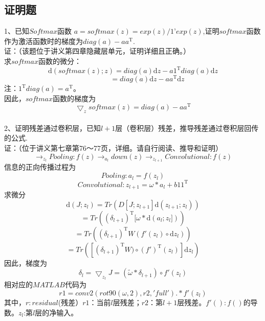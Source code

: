 \documentclass[UFT8]{ctexart}
\begin{document}
\subsection{证明题}
1、已知$Softmax$函数 $a = softmax(z) =exp(z)/1’exp(z)$,证明$softmax$函数作为激活函数时的梯度为$diag(a) - aa^\mathrm{T}$.\\
证：（该题位于讲义第四章隐藏层单元，证明详细且正确。）\\
求$softmax$函数的微分：\\
\begin{displaymath}
\mathrm{d} (softmax(z);z) = diag(a)\mathrm{d} z - a1^\mathrm{T}diag(a)\mathrm{d} z
\end{displaymath}
\[ \qquad \qquad = diag(a)\mathrm{d}z - aa^\mathrm{T}\mathrm{d}z\]
注：$1^\mathrm{T}diag(a) = a^\mathrm{T}$。\\
因此，$softmax$函数的梯度为
\[ \bigtriangledown_{z}softmax(z) = diag(a) - aa^\mathrm{T} \]
~\\

2、证明残差通过卷积层，已知$l+1$层（卷积层）残差，推导残差通过卷积层回传的公式. \\
证：（位于讲义第七章第76～77页，详细。请自行阅读、推导和证明）
\[ \to_{z_{l}} Pooling:f(z) \to_{a_{l}} down(z) \to_{z_{l+1}} Convolutional:f(z) \] 
信息的正向传播过程为
\[ Pooling: a_{l} = f(z_{l}) \]
\[Convolutional: z_{l+1} = \omega \ast a_{l} + b11^\mathrm{T} \]
求微分
\[ \mathrm{d}(J;z_{l}) = Tr(D[J;z_{l+1}]\mathrm{d}(z_{l+1};z_{l}))  \]
\[ = Tr((\delta_{l+1})^\mathrm{T}[\omega \ast \mathrm{d}(a_{l};z_{l}])) \]
\[ =Tr((\delta_{l+1})^\mathrm{T}W(f'(z_{l}) \circ \mathrm{d}z_{l})) \]
\[ = Tr([(\delta_{l+1})^\mathrm{T}W) \circ (f')^\mathrm{T}(z_{l})]\mathrm{d}z_{l}) \]
因此，梯度为
\[ \delta_{l} = \bigtriangledown_{z_{l}}J = (\widetilde{\omega} \ast \delta_{l+1}) \circ f'(z_{l}) \]
相对应的$MATLAB$代码为
\[ r1 = conv2(rot90(\omega,2),r2,'full') .*f'(z_{l}) \]
其中，$r:residual$(残差）$r1$：当前$l$层残差；$r2$：第$l+1$层残差。$f'():f()$的导数。$z_{l}$:第$l$层的净输入。\\
~\\
~\\
\end{document}
